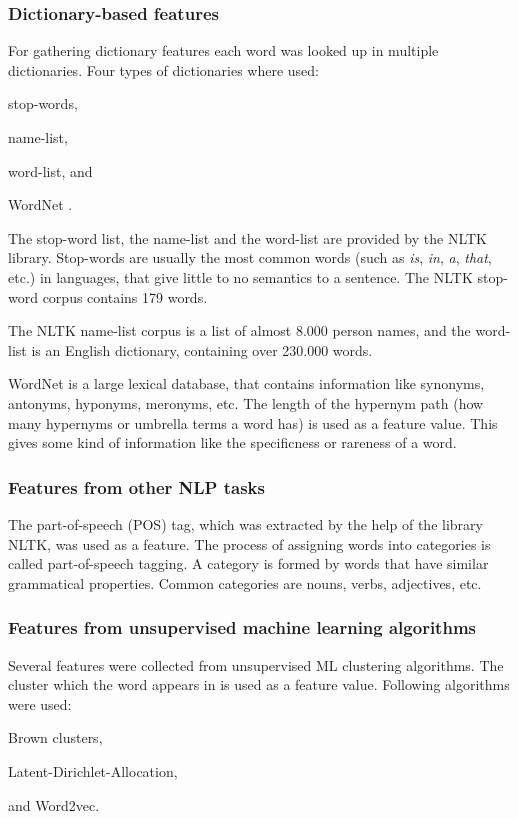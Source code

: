 \documentclass[12pt]{book}
\begin{document}
	\subsubsection{Dictionary-based features}
	\label{sec:dic}
	
	For gathering dictionary features each word was looked up in multiple dictionaries. Four types of dictionaries where used:
	\begin{enumerate*}
		\item stop-words,
		\item name-list,
		\item word-list, and
		\item WordNet \cite{wordnet}.
	\end{enumerate*}

	The stop-word list, the name-list and the word-list are provided by the NLTK library. Stop-words are usually the most common words (such as \textit{is}, \textit{in}, \textit{a}, \textit{that}, etc.) in languages, that give little to no semantics to a sentence. The NLTK stop-word corpus contains 179 words.
	
	The NLTK name-list corpus is a list of almost 8.000 person names, and the word-list is an English dictionary, containing over 230.000 words.
	 
	WordNet is a large lexical database, that contains information like synonyms, antonyms, hyponyms, meronyms, etc. The length of the hypernym path (how many hypernyms or umbrella terms a word has) is used as a feature value. This gives some kind of information like the specificness or rareness of a word.

	\subsubsection{Features from other NLP tasks}
	
	The part-of-speech (POS) tag, which was extracted by the help of the library NLTK, was used as a feature. The process of assigning words into categories is called part-of-speech tagging. A category is formed by words that have similar grammatical properties. Common categories are nouns, verbs, adjectives, etc.
	
	\subsubsection{Features from unsupervised machine learning algorithms}
	\label{sec:unsuperfeat}
	Several features were collected from unsupervised ML clustering algorithms. The cluster which the word appears in is used as a feature value.
	Following algorithms were used: \begin{enumerate*}
		\item Brown clusters, 
		\item Latent-Dirichlet-Allocation, 
		\item and Word2vec.
	\end{enumerate*}
\end{document}
